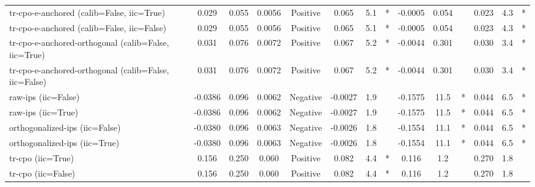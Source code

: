 \begin{table}[htbp]
\begin{tabular}{l|ccccccccccccc}
tr-cpo-e-anchored (calib=False, iic=True) & 0.029 & 0.055 & 0.0056 & Positive & 0.065 & 5.1 & * & -0.0005 & 0.054 &  & 0.023 & 4.3 & * \\
tr-cpo-e-anchored (calib=False, iic=False) & 0.029 & 0.055 & 0.0056 & Positive & 0.065 & 5.1 & * & -0.0005 & 0.054 &  & 0.023 & 4.3 & * \\
tr-cpo-e-anchored-orthogonal (calib=False, iic=True) & 0.031 & 0.076 & 0.0072 & Positive & 0.067 & 5.2 & * & -0.0044 & 0.301 &  & 0.030 & 3.4 & * \\
tr-cpo-e-anchored-orthogonal (calib=False, iic=False) & 0.031 & 0.076 & 0.0072 & Positive & 0.067 & 5.2 & * & -0.0044 & 0.301 &  & 0.030 & 3.4 & * \\
raw-ips (iic=False) & -0.0386 & 0.096 & 0.0062 & Negative & -0.0027 & 1.9 &  & -0.1575 & 11.5 & * & 0.044 & 6.5 & * \\
raw-ips (iic=True) & -0.0386 & 0.096 & 0.0062 & Negative & -0.0027 & 1.9 &  & -0.1575 & 11.5 & * & 0.044 & 6.5 & * \\
orthogonalized-ips (iic=False) & -0.0380 & 0.096 & 0.0063 & Negative & -0.0026 & 1.8 &  & -0.1554 & 11.1 & * & 0.044 & 6.5 & * \\
orthogonalized-ips (iic=True) & -0.0380 & 0.096 & 0.0063 & Negative & -0.0026 & 1.8 &  & -0.1554 & 11.1 & * & 0.044 & 6.5 & * \\
tr-cpo (iic=True) & 0.156 & 0.250 & 0.060 & Positive & 0.082 & 4.4 & * & 0.116 & 1.2 &  & 0.270 & 1.8 &  \\
tr-cpo (iic=False) & 0.156 & 0.250 & 0.060 & Positive & 0.082 & 4.4 & * & 0.116 & 1.2 &  & 0.270 & 1.8 &  \\
\bottomrule
\end{tabular}
\end{table}